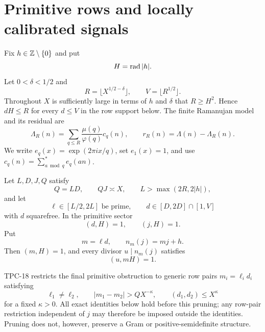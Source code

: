\section{Primitive rows and locally calibrated signals}
\label{sec:tpc20-interface}

Fix \(h\in\mathbb Z\setminus\{0\}\) and put
\begin{equation}
 H=\operatorname{rad}|h|.
 \label{eq:tpc20-H}
\end{equation}
Let \(0<\delta<1/2\) and
\begin{equation}
 R=\lfloor X^{1/2-\delta}\rfloor,
 \qquad V=\lfloor R^{1/2}\rfloor.
 \label{eq:tpc20-RV}
\end{equation}
Throughout \(X\) is sufficiently large in terms of \(h\) and \(\delta\)
that \(R\ge H^2\).  Hence \(dH\le R\) for every \(d\le V\) in the row
support below.
The finite Ramanujan model and its residual are
\begin{equation}
 \Lambda_R(n)=\sum_{q\le R}\frac{\mu(q)}{\varphi(q)}c_q(n),
 \qquad r_R(n)=\Lambda(n)-\Lambda_R(n).
 \label{eq:tpc20-model-residual}
\end{equation}
We write \(e_q(x)=\exp(2\pi i x/q)\), set \(e_1(x)=1\), and use
\(
 c_q(n)=\sum_{a\bmod q}^{*}e_q(an)
\).

Let \(L,D,J,Q\) satisfy
\begin{equation}
 Q=LD,\qquad QJ\asymp X,\qquad
 L>\max(2R,2|h|),
 \label{eq:tpc20-row-scales}
\end{equation}
and let
\begin{equation}
 \ell\in[L/2,2L]\text{ be prime},\qquad
 d\in[D,2D]\cap[1,V]
 \label{eq:tpc20-row-support}
\end{equation}
with \(d\) squarefree.  In the primitive sector
\begin{equation}
 (d,H)=1,\qquad (j,H)=1.
 \label{eq:tpc20-primitive-mask}
\end{equation}
Put
\begin{equation}
 m=\ell d,\qquad n_m(j)=mj+h.
 \label{eq:tpc20-row-target}
\end{equation}
Then \((m,H)=1\), and every divisor \(u\mid n_m(j)\) satisfies
\begin{equation}
 (u,mH)=1.
 \label{eq:tpc20-target-coprimality}
\end{equation}

TPC-18 restricts the final primitive obstruction to generic row pairs
\(m_i=\ell_i d_i\) satisfying
\begin{equation}
 \ell_1\ne\ell_2,\qquad
 |m_1-m_2|>QX^{-\kappa},\qquad
 (d_1,d_2)\le X^\kappa
 \label{eq:tpc20-generic-rows}
\end{equation}
for a fixed \(\kappa>0\).  All exact identities below hold before this
pruning; any row-pair restriction independent of \(j\) may therefore be
imposed outside the identities.  Pruning does not, however, preserve a
Gram or positive-semidefinite structure.

